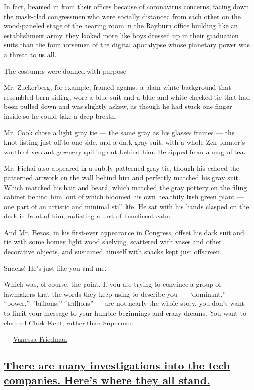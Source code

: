 In fact, beamed in from their offices because of coronavirus concerns,
facing down the mask-clad congressmen who were socially distanced from
each other on the wood-paneled stage of the hearing room in the Rayburn
office building like an establishment army, they looked more like boys
dressed up in their graduation suits than the four horsemen of the
digital apocalypse whose planetary power was a threat to us all.

The costumes were donned with purpose.

Mr. Zuckerberg, for example, framed against a plain white background
that resembled barn siding, wore a blue suit and a blue and white
checked tie that had been pulled down and was slightly askew, as though
he had stuck one finger inside so he could take a deep breath.

Mr. Cook chose a light gray tie --- the same gray as his glasses frames
--- the knot listing just off to one side, and a dark gray suit, with a
whole Zen planter's worth of verdant greenery spilling out behind him.
He sipped from a mug of tea.

Mr. Pichai also appeared in a subtly patterned gray tie, though his
echoed the patterned artwork on the wall behind him and perfectly
matched his gray suit. Which matched his hair and beard, which matched
the gray pottery on the filing cabinet behind him, out of which bloomed
his own healthily lush green plant --- one part of an artistic and
minimal still life. He sat with his hands clasped on the desk in front
of him, radiating a sort of beneficent calm.

And Mr. Bezos, in his first-ever appearance in Congress, offset his dark
suit and tie with some homey light wood shelving, scattered with vases
and other decorative objects, and sustained himself with snacks kept
just offscreen.

Snacks! He's just like you and me.

Which was, of course, the point. If you are trying to convince a group
of lawmakers that the words they keep using to describe you ---
``dominant,'' ``power,'' ``billions,'' ``trillions'' --- are not nearly
the whole story, you don't want to limit your message to your humble
beginnings and crazy dreams. You want to channel Clark Kent, rather than
Superman.

---
\href{https://www.nytimes3xbfgragh.onion/by/vanessa-friedman}{Vanessa
Friedman}

\hypertarget{there-are-many-investigations-into-the-tech-companies-heres-where-they-all-stand}{%
\subsection{\texorpdfstring{\protect\hyperlink{there-are-many-investigations-into-the-tech-companies-heres-where-they-all-stand}{There
are many investigations into the tech companies. Here's where they all
stand.}}{There are many investigations into the tech companies. Here's where they all stand.}}\label{there-are-many-investigations-into-the-tech-companies-heres-where-they-all-stand}}

